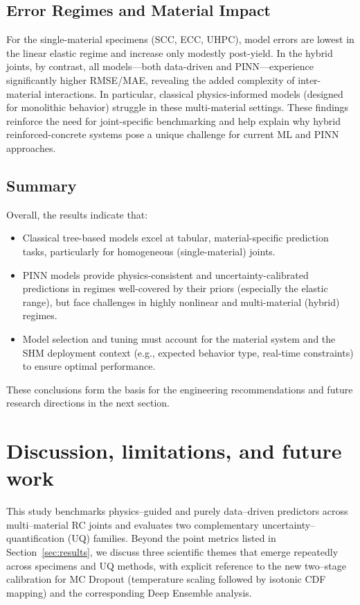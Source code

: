 \documentclass{article}
\begin{document}
\subsection{Error Regimes and Material Impact}

For the single-material specimens (SCC, ECC, UHPC), model errors are lowest in the linear elastic regime and increase only modestly post-yield. In the hybrid joints, by contrast, all models—both data-driven and PINN—experience significantly higher RMSE/MAE, revealing the added complexity of inter-material interactions. In particular, classical physics-informed models (designed for monolithic behavior) struggle in these multi-material settings. These findings reinforce the need for joint-specific benchmarking and help explain why hybrid reinforced-concrete systems pose a unique challenge for current ML and PINN approaches.

\subsection{Summary}

Overall, the results indicate that:
\begin{itemize}
  \item Classical tree-based models excel at tabular, material-specific prediction tasks, particularly for homogeneous (single-material) joints.
  \item PINN models provide physics-consistent and uncertainty-calibrated predictions in regimes well-covered by their priors (especially the elastic range), but face challenges in highly nonlinear and multi-material (hybrid) regimes.
  \item Model selection and tuning must account for the material system and the SHM deployment context (e.g., expected behavior type, real-time constraints) to ensure optimal performance.
\end{itemize}

\vspace{1em}
These conclusions form the basis for the engineering recommendations and future research directions in the next section.


\section{Discussion, limitations, and future work}
\label{sec:discussion}

This study benchmarks physics–guided and purely data–driven predictors across multi–material RC joints and evaluates two complementary uncertainty–quantification (UQ) families. Beyond the point metrics listed in Section~\ref{sec:results}, we discuss three scientific themes that emerge repeatedly across specimens and UQ methods, with explicit reference to the new two–stage calibration for MC Dropout (temperature scaling followed by isotonic CDF mapping) and the corresponding Deep Ensemble analysis.
\end{document}
